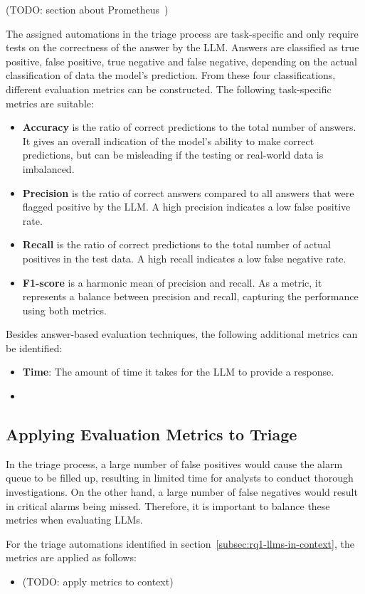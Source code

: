 (TODO: section about Prometheus\ \citep{kim2023prometheus})

The assigned automations in the triage process are task-specific and only require tests on the correctness of the answer
by the LLM\@.
Answers are classified as true positive, false positive, true negative and false negative, depending on the actual
classification of data the model's prediction.
From these four classifications, different evaluation metrics can be constructed.
The following task-specific metrics are suitable:
\begin{itemize}
    \item \textbf{Accuracy} is the ratio of correct predictions to the total number of answers.
    It gives an overall indication of the model's ability to make correct predictions, but can be misleading if the
    testing or real-world data is imbalanced.
    \item \textbf{Precision} is the ratio of correct answers compared to all answers that were flagged positive by the
    LLM\@.
    A high precision indicates a low false positive rate.
    \item \textbf{Recall} is the ratio of correct predictions to the total number of actual positives in the test data.
    A high recall indicates a low false negative rate.
    \item \textbf{F1-score} is a harmonic mean of precision and recall.
    As a metric, it represents a balance between precision and recall, capturing the performance using both metrics.
\end{itemize}

Besides answer-based evaluation techniques, the following additional metrics can be identified:
\begin{itemize}
    \item \textbf{Time}: The amount of time it takes for the LLM to provide a response.
    \item \textbf{}
\end{itemize}

\subsection{Applying Evaluation Metrics to Triage}
\label{subsec:rq2-evaluating-triage}

In the triage process, a large number of false positives would cause the alarm queue to be filled up, resulting in
limited time for analysts to conduct thorough investigations.
On the other hand, a large number of false negatives would result in critical alarms being missed.
Therefore, it is important to balance these metrics when evaluating LLMs.

For the triage automations identified in section\ \ref{subsec:rq1-llms-in-context}, the metrics are applied as
follows:
\begin{itemize}
    \item (TODO: apply metrics to context) %
\end{itemize}

